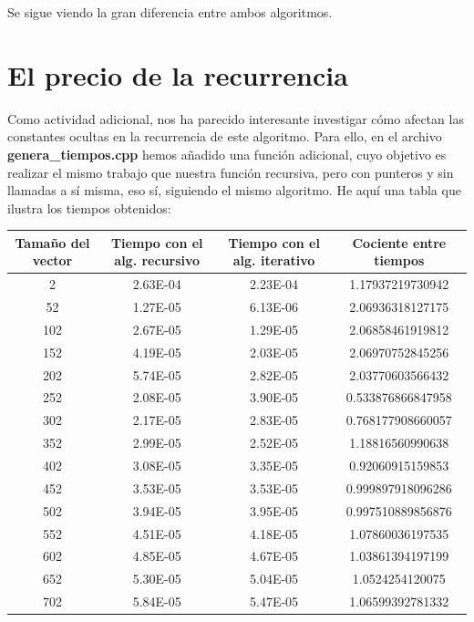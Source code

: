 \documentclass{article}
\begin{document}
	Se sigue viendo la gran diferencia entre ambos algoritmos.

	\section{El precio de la recurrencia}
	Como actividad adicional, nos ha parecido interesante investigar cómo afectan las constantes ocultas en la recurrencia de este algoritmo. Para ello, en el archivo \textbf{genera\_tiempos.cpp} hemos añadido una función adicional, cuyo objetivo es realizar el mismo trabajo que nuestra función recursiva, pero con punteros y sin llamadas a sí misma, eso sí, siguiendo el mismo algoritmo. He aquí una tabla que ilustra los tiempos obtenidos:
	\begin{longtable}{|c|c|c|c|}
		\hline
		Tamaño del vector & Tiempo con el alg. recursivo & Tiempo con el alg. iterativo & Cociente entre tiempos \\ \hline 
		2	    &   2.63E-04	  & 2.23E-04	 &  1.17937219730942   \\ \hline
		52	    &   1.27E-05	  & 6.13E-06	 &  2.06936318127175   \\ \hline
		102	    &   2.67E-05	  & 1.29E-05	 &  2.06858461919812   \\ \hline
		152	    &   4.19E-05	  & 2.03E-05	 &  2.06970752845256   \\ \hline
		202	    &   5.74E-05	  & 2.82E-05	 &  2.03770603566432   \\ \hline
		252	    &   2.08E-05	  & 3.90E-05	 &  0.533876866847958   \\ \hline
		302	    &   2.17E-05	  & 2.83E-05	 &  0.768177908660057   \\ \hline
		352	    &   2.99E-05	  & 2.52E-05	 &  1.18816560990638   \\ \hline
		402	    &   3.08E-05	  & 3.35E-05	 &  0.92060915159853   \\ \hline
		452	    &   3.53E-05	  & 3.53E-05	 &  0.999897918096286   \\ \hline
		502	    &   3.94E-05	  & 3.95E-05	 &  0.997510889856876   \\ \hline
		552	    &   4.51E-05	  & 4.18E-05	 &  1.07860036197535   \\ \hline
		602	    &   4.85E-05	  & 4.67E-05	 &  1.03861394197199   \\ \hline
		652	    &   5.30E-05	  & 5.04E-05	 &  1.0524254120075   \\ \hline
		702	    &   5.84E-05	  & 5.47E-05	 &  1.06599392781332   \\ \hline

\end{longtable}
\end{document}
